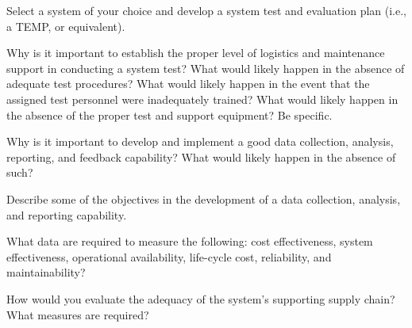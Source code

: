 \begin{exercises}
    \begin{exercise}
    \label{sea-6-7}
        Select a system of your choice and develop a system test and evaluation plan (i.e., a TEMP, or equivalent).
    \end{exercise}
    \begin{solution}
    \end{solution}
    
    \begin{exercise}
    \label{sea-6-8}
        Why is it important to establish the proper level of logistics and maintenance support in conducting a system test? What would likely happen in the absence of adequate test procedures? What would likely happen in the event that the assigned test personnel were inadequately trained? What would likely happen in the absence of the proper test and support equipment? Be specific.
    \end{exercise}
    \begin{solution}
    \end{solution}
    
    \begin{exercise}
    \label{sea-6-9}
        Why is it important to develop and implement a good data collection, analysis, reporting, and feedback capability? What would likely happen in the absence of such?
    \end{exercise}
    \begin{solution}
    \end{solution}
    
    \begin{exercise}
    \label{sea-6-10}
        Describe some of the objectives in the development of a data collection, analysis, and reporting capability.
    \end{exercise}
    \begin{solution}
    \end{solution}
    
    \begin{exercise}
    \label{sea-6-11}
        What data are required to measure the following: cost effectiveness, system effectiveness, operational availability, life-cycle cost, reliability, and maintainability?
    \end{exercise}
    \begin{solution}
    \end{solution}
    
    \begin{exercise}
    \label{sea-6-12}
        How would you evaluate the adequacy of the system’s supporting supply chain?  What measures are required?
    \end{exercise}
    \begin{solution}
    \end{solution}
    

\end{exercises}
